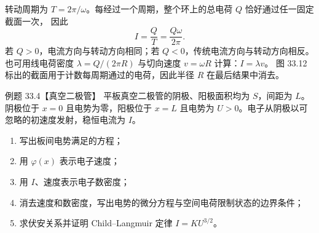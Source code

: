 \begin{xesolution}
转动周期为 $T=2\pi/\omega$。每经过一个周期，整个环上的总电荷 $Q$ 恰好通过任一固定截面一次，
因此
\begin{equation}
  \boxed{I=\frac QT=\frac{Q\omega}{2\pi}}.
\end{equation}
若 $Q>0$，电流方向与转动方向相同；若 $Q<0$，传统电流方向与转动方向相反。也可用线电荷密度
$\lambda=Q/(2\pi R)$ 与切向速度 $v=\omega R$ 计算：$I=\lambda v$。
图 33.12 标出的截面用于计数每周期通过的电荷，因此半径 $R$ 在最后结果中消去。

\rotatingRingDiagram
\end{xesolution}

\Needspace{0.46\textheight}
\begin{origexamplebox}{例题 33.4【真空二极管】}
平板真空二极管的阴极、阳极面积均为 $S$，间距为 $L$。阴极位于 $x=0$ 且电势为零，阳极位于
$x=L$ 且电势为 $U>0$。电子从阴极以可忽略的初速度发射，稳恒电流为 $I$。
\begin{enumerate}[label=(\arabic*),leftmargin=2.2em]
  \item 写出板间电势满足的方程；
  \item 用 $\varphi(x)$ 表示电子速度；
  \item 用 $I$、速度表示电子数密度；
  \item 消去速度和数密度，写出电势的微分方程与空间电荷限制状态的边界条件；
  \item 求伏安关系并证明 Child--Langmuir 定律 $I=KU^{3/2}$。
\end{enumerate}
\end{origexamplebox}

